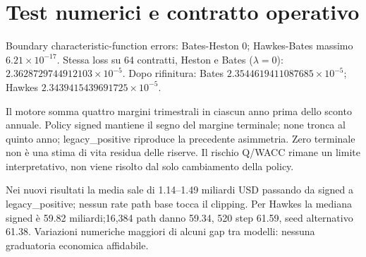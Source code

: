 \documentclass[10pt,a4paper]{article}
\begin{document}
\section{Test numerici e contratto operativo}
Boundary characteristic-function errors: Bates-Heston 0; Hawkes-Bates massimo $6.21\times10^{-17}$. Stessa loss su 64 contratti, Heston e Bates ($\lambda=0$):$2.3628729744912103\times10^{-5}$. Dopo rifinitura: Bates $2.3544619411087685\times10^{-5}$; Hawkes $2.3439415439691725\times10^{-5}$.
\par Il motore somma quattro margini trimestrali in ciascun anno prima dello sconto annuale. Policy signed mantiene il segno del margine terminale; none tronca al quinto anno; legacy\_positive riproduce la precedente asimmetria. Zero terminale non è una stima di vita residua delle riserve. Il rischio Q/WACC rimane un limite interpretativo, non viene risolto dal solo cambiamento della policy.
\par Nei nuovi risultati la media sale di 1.14--1.49 miliardi USD passando da signed a legacy\_positive; nessun rate path base tocca il clipping. Per Hawkes la mediana signed è 59.82 miliardi;16,384 path danno 59.34, 520 step 61.59, seed alternativo 61.38. Variazioni numeriche maggiori di alcuni gap tra modelli: nessuna graduatoria economica affidabile.
\end{document}
